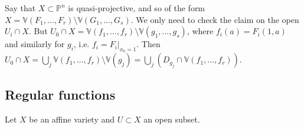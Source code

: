 \documentclass[10pt]{article}
\newcommand{\van}{\mathbb{V}}
\newcommand{\pee}{\mathbb{P}}
\begin{document}
\begin{itemize}
                        Say that $X\subset\pee^n$ is quasi-projective, and so of the form $X=\van(F_1,\ldots,F_r)\setminus\van(G_1,\ldots,G_s)$.
                        We only need to check the claim on the open $U_i\cap X$.
                        But $U_0\cap X=\van(f_1,\ldots,f_r)\setminus\van(g_1,\ldots,g_s)$, where $f_i(a)=F_i(1,a)$ and similarly for $g_i$, i.e. $f_i=F_i|_{x_0=1}$.
                        Then $U_0\cap X=\bigcup_j\van(f_1,\ldots,f_r)\setminus\van(g_j)=\bigcup_j (D_{g_j}\cap\van(f_1,\ldots,f_r))$.
            \end{itemize}

        \subsection{Regular functions}

            Let $X$ be an affine variety and $U\subset X$ an open subset.
\end{document}
